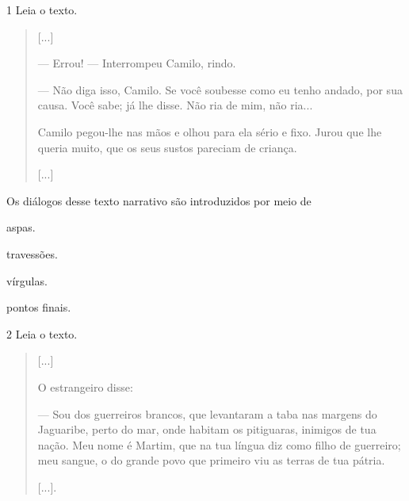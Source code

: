 \num{1} Leia o texto.

\begin{quote}
{[}...{]}

— Errou! — Interrompeu Camilo, rindo.

— Não diga isso, Camilo. Se você soubesse como eu tenho andado, por
sua causa. Você sabe; já lhe disse. Não ria de mim, não ria...

Camilo pegou-lhe nas mãos e olhou para ela sério e fixo. Jurou que lhe
queria muito, que os seus sustos pareciam de criança.

{[}...{]}

\end{quote}

Os diálogos desse texto narrativo são introduzidos por meio de

\begin{minipage}{.5\textwidth}
\begin{escolha}
\item aspas.

\item travessões.

\item vírgulas.

\item pontos finais.
\end{escolha}
\end{minipage}

\num{2} Leia o texto.

\begin{quote}
{[}...{]}

O estrangeiro disse:

— Sou dos guerreiros brancos, que levantaram a taba nas margens do
Jaguaribe, perto do mar, onde habitam os pitiguaras, inimigos de tua
nação. Meu nome é Martim, que na tua língua diz como filho de guerreiro;
meu sangue, o do grande povo que primeiro viu as terras de tua pátria.

{[}...{]}.

\end{quote}

